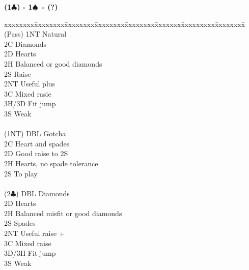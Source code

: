 \documentclass[10pt]{article}
\renewcommand{\c}{$\clubsuit$}
\newcommand{\s}{$\spadesuit$}
\newenvironment{bidtable}[1][]
{\textbf{#1}
  \begin{adjustwidth}{1em}{}
    \addvspace{2pt}
    \begin{tabbing}
      xxxxxxxx\=xxxxxxxx\=xxxxxxxx\=xxxxxxxx\=xxxxxxxx\=xxxxxxx\=xxxxxxxxx\=xxxxxxxx\=\kill}
{\end{tabbing}\end{adjustwidth}\bigskip}%
\begin{document}
\begin{bidtable}[(1\c) - 1\s\ - (?)]
(Pass)    \> 1NT   \> Natural                                   \\
          \> 2C    \> Diamonds                                  \\
          \> 2D    \> Hearts                                    \\
          \> 2H    \> Balanced or good diamonds                 \\
          \> 2S    \> Raise                                     \\
          \> 2NT   \> Useful plus                               \\
          \> 3C    \> Mixed rasie                               \\
          \> 3H/3D \> Fit jump                                  \\
          \> 3S    \> Weak                                      \\
                                                                \\
(1NT)     \> DBL   \> Gotcha                                    \\
          \> 2C    \> Heart and spades                          \\
          \> 2D    \> Good raise to 2S                          \\
          \> 2H    \> Hearts, no spade tolerance                \\
          \> 2S    \> To play                                   \\
                                                                \\
(2\c)     \> DBL   \> Diamonds                                  \\
          \> 2D    \> Hearts                                    \\
          \> 2H    \> Balanced misfit or good diamonds          \\
          \> 2S    \> Spades                                    \\
          \> 2NT   \> Useful raise +                            \\
          \> 3C    \> Mixed raise                               \\
          \> 3D/3H \> Fit jump                                  \\
          \> 3S    \> Weak                                      \\

\end{bidtable}
\end{document}
